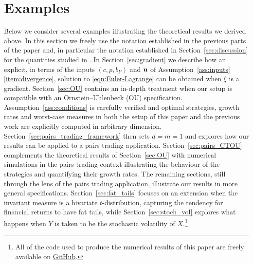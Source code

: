 \documentclass{article}
\theoremstyle{plain}
\theoremstyle{definition}
\numberwithin{lem}{section}
\begin{document}
\section{Examples} \label{sec:examples}
Below we consider several examples illustrating the theoretical results we derived above. In this section we freely use the notation established in the previous parts of the paper and, in particular the notation established in Section~\ref{sec:discussion} for the quantities studied in \cite{itkin2025ergodic}. In Section~\ref{sec:gradient} we describe how an explicit, in terms of the inputs $(c,p,b_Y)$ and ${\bf u}$ of Assumption~\ref{ass:inputs}\ref{item:divergence}, solution to \eqref{eqn:Euler-Lagrange} can be obtained when $\xi$ is a gradient. Section~\ref{sec:OU} contains an in-depth treatment when our setup is compatible with an Ornstein--Uhlenbeck (OU) specification. Assumption~\ref{ass:conditions} is carefully verified and optimal strategies, growth rates and worst-case measures in both the setup of this paper and the previous work \cite{itkin2025ergodic} are explicitly computed in arbitrary dimension. Section~\ref{sec:pairs_trading_framework} then sets $d=m=1$ and explores how our results can be applied to a pairs trading application. Section~\ref{sec:pairs_CTOU} complements the theoretical results of Section~\ref{sec:OU} with numerical simulations in the pairs trading context illustrating the behaviour of the strategies and quantifying their growth rates. The remaining sections, still through the lens of the pairs trading application, illustrate our results in more general specifications. Section~\ref{sec:fat_tails} focuses on an extension when the invariant measure is a bivariate $t$-distribution, capturing the tendency for financial returns to have fat tails, while Section~\ref{sec:stoch_vol} explores what happens when $Y$ is taken to be the stochastic volatility of $X$.\footnote{All of the code used to produce the numerical results of this paper are freely available on \href{https://github.com/balintg1994/stochastic-factors-can-matter-improving-robust-growth-under-ergodicity}{GitHub}. }

\end{document}
